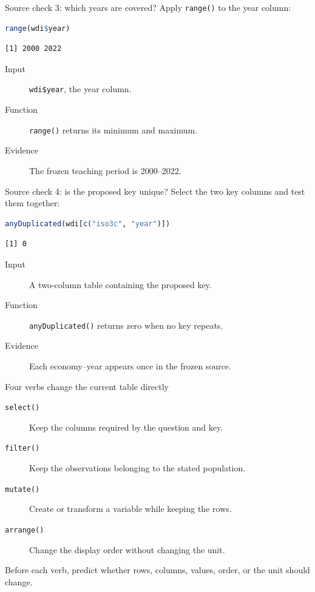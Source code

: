 \begin{frame}[fragile]{Source check 3: which years are covered?}
  Apply \texttt{range()} to the year column:

\begin{lstlisting}[language=R]
range(wdi$year)
\end{lstlisting}

\begin{lstlisting}
[1] 2000 2022
\end{lstlisting}

  \begin{description}
    \item[Input] \texttt{wdi\$year}, the year column.
    \item[Function] \texttt{range()} returns its minimum and maximum.
    \item[Evidence] The frozen teaching period is 2000--2022.
  \end{description}
\end{frame}

\begin{frame}[fragile]{Source check 4: is the proposed key unique?}
  Select the two key columns and test them together:

\begin{lstlisting}[language=R]
anyDuplicated(wdi[c("iso3c", "year")])
\end{lstlisting}

\begin{lstlisting}
[1] 0
\end{lstlisting}

  \begin{description}
    \item[Input] A two-column table containing the proposed key.
    \item[Function] \texttt{anyDuplicated()} returns zero when no key repeats.
    \item[Evidence] Each economy--year appears once in the frozen source.
  \end{description}
\end{frame}

\begin{frame}{Four verbs change the current table directly}
  \begin{description}
    \item[\texttt{select()}] Keep the columns required by the question and key.
    \item[\texttt{filter()}] Keep the observations belonging to the stated population.
    \item[\texttt{mutate()}] Create or transform a variable while keeping the rows.
    \item[\texttt{arrange()}] Change the display order without changing the unit.
  \end{description}

  \vfill
  Before each verb, predict whether rows, columns, values, order, or the unit
  should change.
\end{frame}

